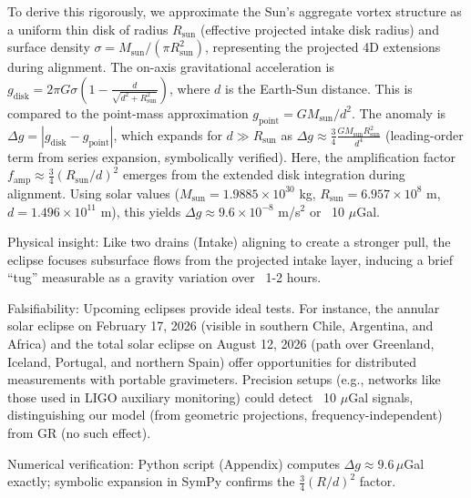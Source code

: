 To derive this rigorously, we approximate the Sun's aggregate vortex structure as a uniform thin disk of radius $R_\text{sun}$ (effective projected intake disk radius) and surface density $\sigma = M_\text{sun} / (\pi R_\text{sun}^2)$, representing the projected 4D extensions during alignment. The on-axis gravitational acceleration is $g_{\text{disk}} = 2 \pi G \sigma \left(1 - \frac{d}{\sqrt{d^2 + R_\text{sun}^2}}\right)$, where $d$ is the Earth-Sun distance. This is compared to the point-mass approximation $g_{\text{point}} = G M_\text{sun} / d^2$. The anomaly is $\Delta g = |g_{\text{disk}} - g_{\text{point}}|$, which expands for $d \gg R_\text{sun}$ as $\Delta g \approx \frac{3}{4} \frac{G M_\text{sun} R_\text{sun}^2}{d^4}$ (leading-order term from series expansion, symbolically verified). Here, the amplification factor $f_{\text{amp}} \approx \frac{3}{4} (R_\text{sun}/d)^2$ emerges from the extended disk integration during alignment. Using solar values ($M_\text{sun} = 1.9885 \times 10^{30}$ kg, $R_\text{sun} = 6.957 \times 10^8$ m, $d = 1.496 \times 10^{11}$ m), this yields $\Delta g \approx 9.6 \times 10^{-8}$ m/s$^2$ or ~10 $\mu$Gal.

Physical insight: Like two drains (Intake) aligning to create a stronger pull, the eclipse focuses subsurface flows from the projected intake layer, inducing a brief ``tug'' measurable as a gravity variation over ~1-2 hours.

Falsifiability: Upcoming eclipses provide ideal tests. For instance, the annular solar eclipse on February 17, 2026 (visible in southern Chile, Argentina, and Africa) and the total solar eclipse on August 12, 2026 (path over Greenland, Iceland, Portugal, and northern Spain) offer opportunities for distributed measurements with portable gravimeters. Precision setups (e.g., networks like those used in LIGO auxiliary monitoring) could detect ~10 $\mu$Gal signals, distinguishing our model (from geometric projections, frequency-independent) from GR (no such effect).

Numerical verification: Python script (Appendix) computes $\Delta g \approx 9.6 \, \mu$Gal exactly; symbolic expansion in SymPy confirms the $\frac{3}{4} (R/d)^2$ factor.

\medskip
\noindent
{}
\medskip



